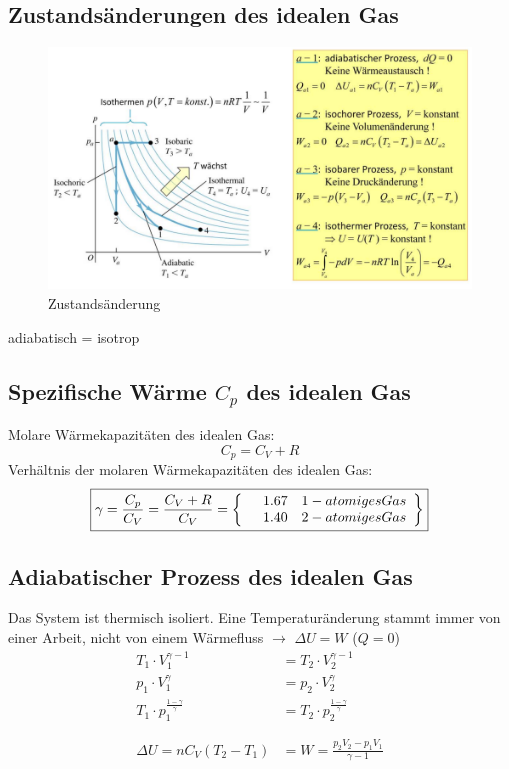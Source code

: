 \newpage

\subsection{Zustandsänderungen des idealen Gas}
\begin{figure}[h!]
	\begin{center}
		\leavevmode
		\includegraphics[scale=0.42, trim = 0mm 0mm 0mm 0mm, clip]{pic/zustandsaenderung.png}
		\caption{Zustandsänderung}
	\end{center}
\end{figure}
adiabatisch = isotrop
\\

\subsection{Spezifische Wärme $C_p$ des idealen Gas}
Molare Wärmekapazitäten des idealen Gas:
\[\boxed{
	C_p=C_V+R
}\]
Verhältnis der molaren Wärmekapazitäten des idealen Gas:
\[\boxed{
	\gamma = \frac{C_p}{C_V}=\frac{C_V+R}{C_V}=
	\begin{aligned}
		\left\{
		\begin{array}{l l}
			& 1.67 \quad  1-atomiges Gas  \\ 
			& 1.40 \quad  2-atomiges Gas
		\end{array}
		\right\}
	\end{aligned}
}\]

\subsection{Adiabatischer Prozess des idealen Gas}
Das System ist thermisch isoliert. Eine Temperaturänderung stammt immer von einer Arbeit, nicht von einem Wärmefluss $\rightarrow$ $\Delta U=W$ ($Q=0$)
\\
\[\boxed{
	\begin{aligned}
	T_1\cdot V_1^{\gamma-1} &= T_2\cdot V_2^{\gamma-1}\\ 
	p_1\cdot V_1^{\gamma} &= p_2\cdot V_2^{\gamma} \\
	T_1\cdotp p_1^{\frac{1-\gamma}{\gamma}} &= T_2\cdot p_2^{\frac{1-\gamma}{\gamma}}\\
	\\\\
	\Delta U=nC_V(T_2-T_1)&=W=\frac{p_2V_2-p_1V_1}{\gamma-1}
	\end{aligned}	
}\]


